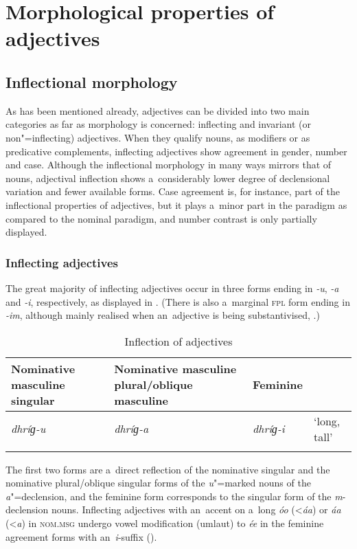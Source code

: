 \section{Morphological properties of adjectives}
\label{sec:6-3}

\subsection{Inflectional morphology}
\label{subsec:6-3-1}

As has been mentioned already, adjectives can be divided into two main categories as far as morphology is concerned: inflecting and invariant (or non"=inflecting) adjectives. When they qualify nouns, as modifiers or as predicative complements, inflecting adjectives show agreement in gender, number and case. Although the inflectional morphology in many ways mirrors that of nouns, adjectival inflection shows a~considerably lower degree of declensional variation and fewer available forms. Case agreement is, for instance, part of the inflectional properties of adjectives, but it plays a~minor part in the paradigm as compared to the nominal paradigm, and number contrast is only partially displayed.

\subsubsection*{Inflecting adjectives}

The great majority of inflecting adjectives occur in three forms ending in \textit{-u}, \textit{-a} and \textit{-i}, respectively, as displayed in . (There is also a~marginal \textsc{fpl} form ending in \textit{-im}, although mainly realised when an~adjective is being substantivised, .)


\begin{table}[p]
\caption{Inflection of adjectives}
\begin{tabularx}{\textwidth}{ Q Q l l }
\lsptoprule
Nominative masculine singular &
Nominative masculine plural/oblique masculine &
Feminine &
\\\hline
\textit{dhríɡ-u} &
\textit{dhríɡ-a} &
\textit{dhríɡ-i} &
`long, tall'\\\lspbottomrule
\end{tabularx}
\label{tab:6-2}
\end{table}


The first two forms are a~direct reflection of the nominative singular and the nominative plural/oblique singular forms of the \textit{u}"=marked nouns of the \textit{a}"=declension, and the feminine form corresponds to the singular form of the \textit{m}-declension nouns. Inflecting adjectives with an~accent on a~long \textit{óo} ({\textless}\textit{áa}) or \textit{áa} ({\textless}\textit{a}) in \textsc{nom.msg} undergo vowel modification (umlaut) to \textit{ée} in the feminine agreement forms with an~\textit{i}-suffix ().


